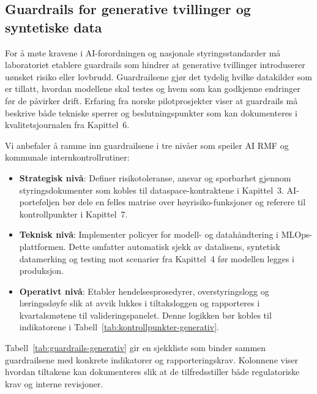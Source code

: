 \subsection{Guardrails for generative tvillinger og syntetiske data}
For å møte kravene i AI-forordningen og nasjonale styringsstandarder må laboratoriet etablere guardrails som hindrer at generative tvillinger introduserer uønsket risiko eller lovbrudd.\citep{eu2024aiact,dfo2024internkontroll} Guardrailsene gjør det tydelig hvilke datakilder som er tillatt, hvordan modellene skal testes og hvem som kan godkjenne endringer før de påvirker drift. Erfaring fra norske pilotprosjekter viser at guardrails må beskrive både tekniske sperrer og beslutningspunkter som kan dokumenteres i kvalitetsjournalen fra Kapittel~6.

Vi anbefaler å ramme inn guardrailsene i tre nivåer som speiler AI RMF og kommunale internkontrollrutiner:
\begin{itemize}
    \item \textbf{Strategisk nivå}: Definer risikotoleranse, ansvar og sporbarhet gjennom styringsdokumenter som kobles til dataspace-kontraktene i Kapittel~3. AI-porteføljen bør dele en felles matrise over høyrisiko-funksjoner og referere til kontrollpunkter i Kapittel~7.
    \item \textbf{Teknisk nivå}: Implementer policyer for modell- og datahåndtering i MLOps-plattformen. Dette omfatter automatisk sjekk av datalisens, syntetisk datamerking og testing mot scenarier fra Kapittel~4 før modellen legges i produksjon.\citep{nist2023airmf}
    \item \textbf{Operativt nivå}: Etabler hendelsesprosedyrer, overstyringslogg og læringssløyfe slik at avvik lukkes i tiltaksloggen og rapporteres i kvartalsmøtene til valideringspanelet. Denne logikken bør kobles til indikatorene i Tabell~\ref{tab:kontrollpunkter-generativ}.
\end{itemize}

Tabell~\ref{tab:guardrails-generativ} gir en sjekkliste som binder sammen guardrailsene med konkrete indikatorer og rapporteringskrav. Kolonnene viser hvordan tiltakene kan dokumenteres slik at de tilfredsstiller både regulatoriske krav og interne revisjoner.

